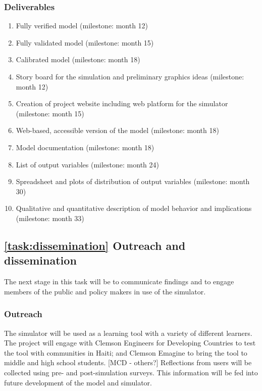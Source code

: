 \documentclass[11pt,a4paper]{article}
\begin{document}
\subsubsection{Deliverables}
\begin{enumerate}
\vspace{-9pt}
\setlength{\itemsep}{-3pt}
\setcounter{enumi}{7}
	\item	Fully verified model (milestone: month 12)
	\item	Fully validated model (milestone: month 15)
	\item	Calibrated model (milestone: month 18)
	\item	Story board for the simulation and preliminary graphics ideas (milestone: month 12)
	\item	Creation of project website including web platform for the simulator (milestone: month 15)
	\item 	Web-based, accessible version of the model (milestone: month 18)
	\item 	Model documentation (milestone: month 18) 
	\item	List of output variables (milestone: month 24)
	\item	Spreadsheet and plots of distribution of output variables (milestone: month 30)
	\item	Qualitative and quantitative description of 
				model behavior and implications (milestone: month 33)
\end{enumerate}

\subsection{\ref{task:dissemination} Outreach and dissemination}
\label{sec:task:dissemination}

The next stage in this task will be 
to communicate findings and
to engage members of the public and policy makers in use of the simulator. 

\subsubsection{Outreach}

The simulator will be used as a learning tool with a variety of different learners.
The project will engage with 
Clemson Engineers for Developing Countries to test the tool with communities in Haiti; and
Clemson Emagine to bring the tool to middle and high school students.
[MCD - others?]
Reflections from users will be collected using pre- and post-simulation surveys.
This information will be fed into future development of the model and simulator.
\end{document}
